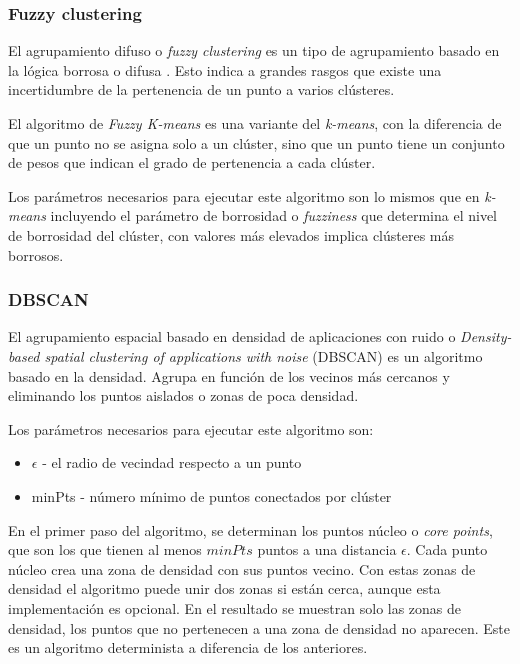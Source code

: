 \subsubsection{Fuzzy clustering}
El agrupamiento difuso o \emph{fuzzy clustering} \cite{wiki:fuzzy} es un tipo de agrupamiento basado en la lógica borrosa o difusa \cite{wiki:logicaDifusa}. Esto indica a grandes rasgos que existe una incertidumbre de la pertenencia de un punto a varios clústeres.

El algoritmo de \emph{Fuzzy K-means} es una variante del \emph{k-means}, con la diferencia de que un punto no se asigna solo a un clúster, sino que un punto tiene un conjunto de pesos que indican el grado de pertenencia a cada clúster. 

Los parámetros necesarios para ejecutar este algoritmo son lo mismos que en \emph{k-means} incluyendo el parámetro de borrosidad o \emph{fuzziness} que determina el nivel de borrosidad del clúster, con valores más elevados implica clústeres más borrosos.

\subsubsection{DBSCAN}
El agrupamiento espacial basado en densidad de aplicaciones con ruido o \emph{Density-based spatial clustering of applications with noise} (DBSCAN) \cite{DBSCAN_paper} es un algoritmo basado en la densidad. Agrupa en función de los vecinos más cercanos y eliminando los puntos aislados o zonas de poca densidad.

Los parámetros necesarios para ejecutar este algoritmo son:
\begin{itemize}
	\tightlist
	\item $\epsilon$ - el radio de vecindad respecto a un punto
	\item minPts - número mínimo de puntos conectados por clúster
\end{itemize} 

En el primer paso del algoritmo, se determinan los puntos núcleo o \emph{core points}, que son los que tienen al menos $minPts$ puntos a una distancia $\epsilon$. Cada punto núcleo crea una zona de densidad con sus puntos vecino. Con estas zonas de densidad el algoritmo puede unir dos zonas si están cerca, aunque esta implementación es opcional.
En el resultado se muestran solo las zonas de densidad, los puntos que no pertenecen a una zona de densidad no aparecen. Este es un algoritmo determinista a diferencia de los anteriores.

